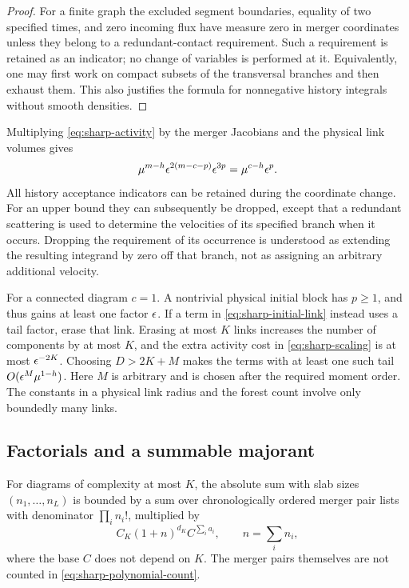 \begin{proof}
For a finite graph the excluded segment boundaries, equality of two
specified times, and zero incoming flux have measure zero in merger
coordinates unless they belong to a redundant-contact requirement.
Such a requirement is retained as an indicator; no change of variables
is performed at it.  Equivalently, one may first work on compact subsets
of the transversal branches and then exhaust them.  This also justifies
the formula for nonnegative history integrals without smooth densities.
\end{proof}

Multiplying \eqref{eq:sharp-activity} by the merger Jacobians and the
physical link volumes gives
\begin{equation}\label{eq:sharp-scaling}
 \mu^{m-h}\epsilon^{2(m-c-p)}\epsilon^{3p}
                     =\mu^{c-h}\epsilon^p.
\end{equation}
All history acceptance indicators can be retained during the coordinate
change.  For an upper bound they can subsequently be dropped, except
that a redundant scattering is used to determine the velocities of its
specified branch when it occurs.  Dropping the requirement of its
occurrence is understood as extending the resulting integrand by zero
off that branch, not as assigning an arbitrary additional velocity.

For a connected diagram \(c=1\).  A nontrivial physical initial block
has \(p\ge1\), and thus gains at least one factor \(\epsilon\).  If a term
in \eqref{eq:sharp-initial-link} instead uses a tail factor, erase that
link.  Erasing at most \(K\) links increases the number of components
by at most \(K\), and the extra activity cost in
\eqref{eq:sharp-scaling} is at most \(\epsilon^{-2K}\).  Choosing
\(D>2K+M\) makes the terms with at least one such tail
\(O(\epsilon^M\mu^{1-h})\).  Here \(M\) is arbitrary and is chosen after
the required moment order.  The constants in a physical link radius
and the forest count involve only boundedly many links.

\subsection{Factorials and a summable majorant}

\begin{lemma}\label{lem:sharp-factorials}
For diagrams of complexity at most \(K\), the absolute sum with slab
sizes \((n_1,\ldots,n_L)\) is bounded by a sum over chronologically
ordered merger pair lists with denominator \(\prod_i n_i!\), multiplied
by
\begin{equation}\label{eq:sharp-polynomial-count}
 C_K(1+n)^{d_K}C^{\sum_i a_i},
 \qquad n=\sum_i n_i,
\end{equation}
where the base \(C\) does not depend on \(K\).  The merger pairs
themselves are not counted in \eqref{eq:sharp-polynomial-count}.
\end{lemma}

